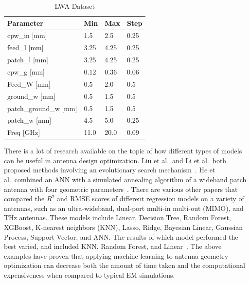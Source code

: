\documentclass[conference]{IEEEtran}
\begin{document}
\begin{table}[h]
\caption{LWA Dataset}
\begin{center}
\begin{tabular}{ |l|l|l|l| }
    \hline
    Parameter & Min & Max & Step \\ 
    \hline
    cpw\_in [mm] & 1.5 & 2.5 & 0.25 \\
    \hline
    feed\_l [mm] & 3.25 & 4.25 & 0.25 \\
    \hline
    patch\_l [mm] & 3.25 & 4.25 & 0.25 \\
    \hline
    cpw\_g [mm] & 0.12 & 0.36 & 0.06 \\
    \hline
    Feed\_W [mm] & 0.5 & 2.0 & 0.5 \\
    \hline
    ground\_w [mm] & 0.5 & 1.5 & 0.5 \\
    \hline
    patch\_ground\_w [mm] & 0.5 & 1.5 & 0.5 \\
    \hline
    patch\_w [mm] & 4.5 & 5.0 & 0.25 \\
    \hline
    Freq [GHz] & 11.0 & 20.0 & 0.09 \\
    \hline
\end{tabular}
\end{center}
\label{antenna_design_lw}
\end{table}

There is a lot of research available on the topic of how different types of models can be useful in antenna design optimization. Liu et al.~and Li et al.~both proposed methods involving an evolutionary search mechanism~\cite{liu_efficient_2014,li_adaptive_2023}. He et al.~combined an ANN with a simulated annealing algorithm of a wideband patch antenna with four geometric parameters~\cite{10318051}. There are various other papers that compared the $R^2$ and RMSE scores of different regression models on a variety of antennas, such as an ultra-wideband, dual-port multi-in multi-out (MIMO), and THz antennas. These models include Linear, Decision Tree, Random Forest, XGBoost, K-nearest neighbors (KNN), Lasso, Ridge, Bayesian Linear, Gaussian Process, Support Vector, and ANN. The results of which model performed the best varied, and included KNN, Random Forest, and Linear~\cite{9119820,ranjan_ultra-wideband_2022,ranjan_design_2023,sharma_machine_2020,jain_estimation_2022,jain_design_2024,haque_machine_2023,m_el-kenawy_optimized_2022}. The above examples have proven that applying machine learning to antenna geometry optimization can decrease both the amount of time taken and the computational expensiveness when compared to typical EM simulations.
\end{document}
